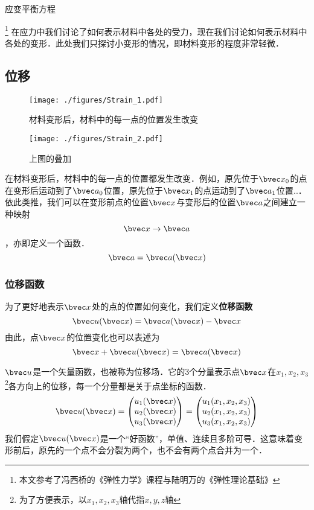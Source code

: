 
\begin{issues}
\issueTODO 
应变平衡方程
\end{issues}

\footnote{本文参考了冯西桥的《弹性力学》课程与陆明万的《弹性理论基础》}
在应力中我们讨论了如何表示材料中各处的受力，现在我们讨论如何表示材料中各处的变形．此处我们只探讨小变形的情况，即材料变形的程度非常轻微．
\subsection{位移}
\begin{figure}[ht]
\centering
\texttt{[image: ./figures/Strain\_1.pdf]}
\caption{材料变形后，材料中的每一点的位置发生改变} \label{Strain_fig1}
\end{figure}
\begin{figure}[ht]
\centering
\texttt{[image: ./figures/Strain\_2.pdf]}
\caption{上图的叠加} \label{Strain_fig2}
\end{figure}

在材料变形后，材料中的每一点的位置都发生改变．例如，原先位于$\bvec x_0$的点在变形后运动到了$\bvec a_0$位置，原先位于$\bvec x_1$的点运动到了$\bvec a_1$位置..．依此类推，我们可以在变形前点的位置$\bvec x$与变形后的位置$\bvec a$之间建立一种映射$$\bvec x\rightarrow \bvec a$$，亦即定义一个函数．$$\bvec a = \bvec a (\bvec x)$$

\subsubsection{位移函数}
为了更好地表示$\bvec x$处的点的位置如何变化，我们定义\textbf{位移函数}
\begin{equation}
\bvec u (\bvec x) =\bvec a (\bvec x) - \bvec x
\end{equation}
由此，点$\bvec x$的位置变化也可以表述为
\begin{equation}
\bvec x + \bvec u (\bvec x) =\bvec a (\bvec x) 
\end{equation}

$\bvec u$是一个矢量函数，也被称为位移场．它的3个分量表示点$\bvec x$在$x_1, x_2, x_3$\footnote{为了方便表示，以$x_1, x_2, x_3$轴代指$x,y,z$轴}各方向上的位移，每一个分量都是关于点坐标的函数．
$$\bvec u(\bvec x) = 
\begin{pmatrix}
u_1(\bvec x)\\
u_2(\bvec x)\\
u_3(\bvec x)\\
\end{pmatrix}
=
\begin{pmatrix}
u_1(x_1, x_2, x_3)\\
u_2(x_1, x_2, x_3)\\
u_3(x_1, x_2, x_3)\\
\end{pmatrix}
$$
我们假定$\bvec u(\bvec x)$是一个“好函数”，单值、连续且多阶可导．这意味着变形前后，原先的一个点不会分裂为两个，也不会有两个点合并为一个．

